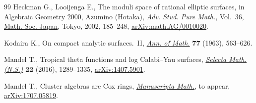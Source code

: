 \documentclass[11pt]{article}
\numberwithin{equation}{section}
\numberwithin{figure}{section}
\numberwithin{table}{section}
\theoremstyle{definition}
\begin{document}
\begin{thebibliography}{99}
Heckman G., Looijenga E., The moduli space of rational elliptic surfaces, in
 Algebraic Geometry 2000, {A}zumino ({H}otaka), \textit{Adv. Stud. Pure
 Math.}, Vol.~36, \href{https://doi.org/10.2969/aspm/03610185}{Math. Soc. Japan}, Tokyo, 2002, 185--248,
 \href{https://arxiv.org/abs/math.AG/0010020}{arXiv:math.AG/0010020}.

Kodaira K., On compact analytic surfaces.~{II}, \href{https://doi.org/10.2307/1970131}{\textit{Ann. of Math.}}
 \textbf{77} (1963), 563--626.

Mandel T., Tropical theta functions and log {C}alabi--{Y}au surfaces,
 \href{https://doi.org/10.1007/s00029-015-0221-y}{\textit{Selecta Math. (N.S.)}} \textbf{22} (2016), 1289--1335,
 \href{https://arxiv.org/abs/1407.5901}{arXiv:1407.5901}.

Mandel T., Cluster algebras are {C}ox rings, \href{https://doi.org/10.1007/s00229-018-1054-8}{\textit{Manuscripta Math.}}, {t}o
 appear, \href{https://arxiv.org/abs/1707.05819}{arXiv:1707.05819}.

\end{thebibliography}
\end{document}

